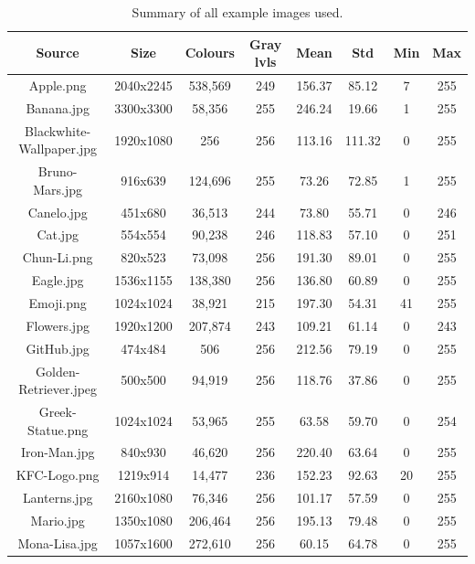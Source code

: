 \documentclass[11pt,a4paper]{article}
\begin{document}
\begin{table}[htbp]
  \centering
  \caption{Summary of all example images used.}
  \label{tab:images}
  \begin{tabular}{|c|c|c|c|c|c|c|c|}
    \hline 
    Source & Size & Colours & Gray lvls &Mean & Std & Min & Max \\
    \hline
    Apple.png                & 2040x2245  & 538,569 & 249 & 156.37 & 85.12 & 7 & 255 \\
    Banana.jpg               & 3300x3300  & 58,356  & 255 & 246.24 & 19.66 & 1 & 255 \\
    Blackwhite-Wallpaper.jpg & 1920x1080  & 256     & 256 & 113.16 & 111.32 & 0 & 255 \\
    Bruno-Mars.jpg           & 916x639    & 124,696 & 255 & 73.26  & 72.85  & 1 & 255 \\
    Canelo.jpg               & 451x680    & 36,513  & 244 & 73.80  & 55.71  & 0 & 246 \\
    Cat.jpg                  & 554x554    & 90,238  & 246 & 118.83 & 57.10  & 0 & 251 \\
    Chun-Li.png              & 820x523    & 73,098  & 256 & 191.30 & 89.01  & 0 & 255 \\
    Eagle.jpg                & 1536x1155  & 138,380 & 256 & 136.80 & 60.89  & 0 & 255 \\
    Emoji.png                & 1024x1024  & 38,921  & 215 & 197.30 & 54.31  & 41 & 255 \\
    Flowers.jpg              & 1920x1200  & 207,874 & 243 & 109.21 & 61.14  & 0 & 243 \\
    GitHub.jpg               & 474x484    & 506     & 256 & 212.56 & 79.19  & 0 & 255 \\
    Golden-Retriever.jpeg    & 500x500    & 94,919  & 256 & 118.76 & 37.86  & 0 & 255 \\
    Greek-Statue.png         & 1024x1024  & 53,965  & 255 & 63.58  & 59.70  & 0 & 254 \\
    Iron-Man.jpg             & 840x930    & 46,620  & 256 & 220.40 & 63.64  & 0 & 255 \\
    KFC-Logo.png             & 1219x914   & 14,477  & 236 & 152.23 & 92.63  & 20 & 255 \\
    Lanterns.jpg             & 2160x1080  & 76,346  & 256 & 101.17 & 57.59  & 0 & 255 \\
    Mario.jpg                & 1350x1080  & 206,464 & 256 & 195.13 & 79.48  & 0 & 255 \\
    Mona-Lisa.jpg            & 1057x1600  & 272,610 & 256 & 60.15  & 64.78  & 0 & 255 \\

\end{tabular}
\end{table}
\end{document}

